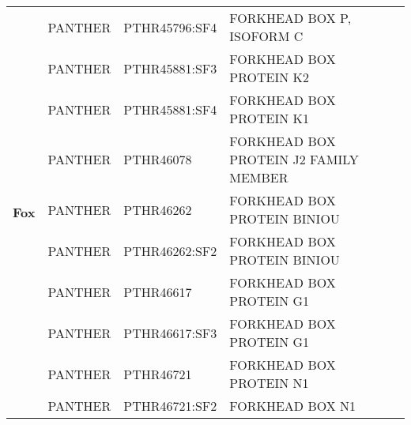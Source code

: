 \documentclass[../main.tex]{subfiles}
\begin{document}
\begin{landscape}
\begin{longtable}{@{}cllll@{}}
		\multirow{15}{*}{\textbf{Fox}}  & PANTHER              & PTHR45796:SF4   & FORKHEAD BOX P, ISOFORM C                                                                                                                    & \\
		                                & PANTHER              & PTHR45881:SF3   & FORKHEAD BOX PROTEIN K2                                                                                                                      & \\
		                                & PANTHER              & PTHR45881:SF4   & FORKHEAD BOX PROTEIN K1                                                                                                                      & \\
		                                & PANTHER              & PTHR46078       & FORKHEAD BOX PROTEIN J2 FAMILY MEMBER                                                                                                        & \\
		                                & PANTHER              & PTHR46262       & FORKHEAD BOX PROTEIN BINIOU                                                                                                                  & \\
		                                & PANTHER              & PTHR46262:SF2   & FORKHEAD BOX PROTEIN BINIOU                                                                                                                  & \\
		                                & PANTHER              & PTHR46617       & FORKHEAD BOX PROTEIN G1                                                                                                                      & \\
		                                & PANTHER              & PTHR46617:SF3   & FORKHEAD BOX PROTEIN G1                                                                                                                      & \\
		                                & PANTHER              & PTHR46721       & FORKHEAD BOX PROTEIN N1                                                                                                                      & \\
		                                & PANTHER              & PTHR46721:SF2   & FORKHEAD BOX N1                                                                                                                              & \\

\end{longtable}
\end{landscape}
\end{document}
